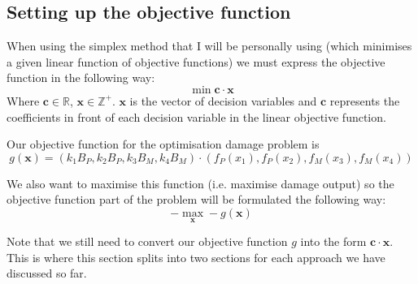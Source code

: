 \documentclass{article}
\begin{document}
\subsection{Setting up the objective function}
\par When using the simplex method that I will be personally using (which minimises a given linear function of objective functions) we must express the objective function in the following way:
$$\min \boldsymbol{c}\cdot\boldsymbol{x}$$
Where $\boldsymbol{c} \in \mathbb{R}$, $\boldsymbol{x} \in \mathbb{Z}^+$. $\boldsymbol{x}$ is the vector of decision variables and $\boldsymbol{c}$ represents the coefficients in front of each decision variable in the linear objective function.
\par Our objective function for the optimisation damage problem is
$$g(\boldsymbol{x})=(k_1 B_P, k_2 B_P, k_3 B_M, k_4 B_M)\cdot (f_P (x_1), f_P(x_2), f_M(x_3), f_M(x_4))$$
\par We also want to maximise this function (i.e. maximise damage output) so the objective function part of the problem will be formulated the following way:
$$-\max_{\boldsymbol{x}} - g(\boldsymbol{x})$$
\par Note that we still need to convert our objective function $g$ into the form $\boldsymbol{c} \cdot \boldsymbol{x}$. This is where this section splits into two sections for each approach we have discussed so far.
\end{document}
